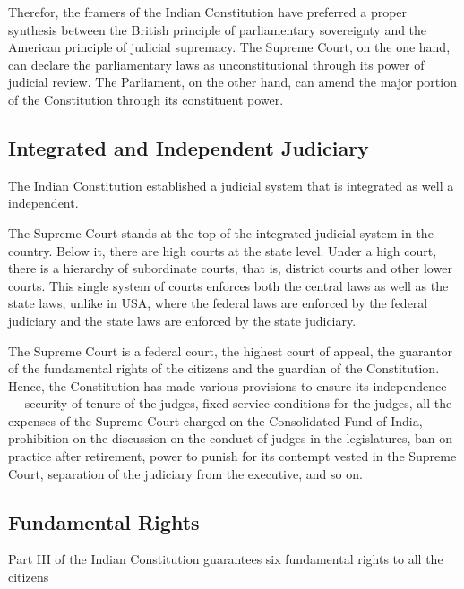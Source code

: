 \begin{multicols}{2}
Therefor, the framers of the Indian Constitution have preferred a proper synthesis between the British principle of parliamentary sovereignty and the American principle of judicial supremacy. The Supreme Court, on the one hand, can declare the parliamentary laws as unconstitutional through its power of judicial review. The Parliament, on the other hand, can amend the major portion of the Constitution through its constituent power.

\subsection{Integrated and Independent Judiciary}

The Indian Constitution established a judicial system that is integrated as well a independent.

The Supreme Court stands at the top of the integrated judicial system in the country. Below it, there are high courts at the state level. Under a high court, there is a hierarchy of subordinate courts, that is, district courts and other lower courts. This single system of courts enforces both the central laws as well as the state laws, unlike in USA, where the federal laws are enforced by the federal judiciary and the state laws are enforced by the state judiciary.

The Supreme Court is a federal court, the highest court of appeal, the guarantor of the fundamental rights of the citizens and the guardian of the Constitution. Hence, the Constitution has made various provisions to ensure its independence — security of tenure of the judges, fixed service conditions for the judges, all the expenses of the Supreme Court charged on the Consolidated Fund of India, prohibition on the discussion on the conduct of judges in the legislatures, ban on practice after retirement, power to punish for its contempt vested in the Supreme Court, separation of the judiciary from the executive, and so on.

\subsection{Fundamental Rights}

Part III of the Indian Constitution guarantees six fundamental rights to all the citizens


\end{multicols}

